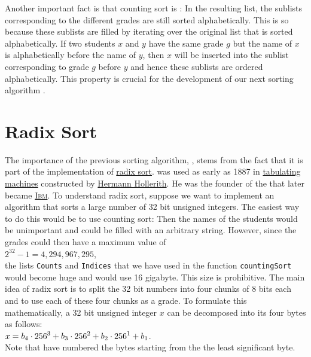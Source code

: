 Another important fact is that counting sort is : In the resulting list, the sublists
corresponding to the different grades are still sorted alphabetically.  This is so because these sublists are
filled by iterating over the original list that is sorted alphabetically.  If two students $x$ and $y$ have the
same grade $g$ but the name of $x$ is alphabetically before the name of $y$, then $x$ will be inserted into the
sublist corresponding to grade $g$ before $y$ and hence these sublists are ordered alphabetically.  This property
is crucial for the development of our next sorting algorithm .

\section{Radix Sort}
The importance of the previous sorting algorithm, , stems from the fact that it is part of the
implementation of \href{https://en.wikipedia.org/wiki/Radix_sort}{radix sort}.   was used as early as 1887 in
\href{https://en.wikipedia.org/wiki/Tabulating_machine}{tabulating machines} constructed by
\href{https://en.wikipedia.org/wiki/Herman_Hollerith}{Hermann Hollerith}.  He was the founder of
the  that later became \href{https://en.wikipedia.org/wiki/IBM}{\textsc{Ibm}}.
To understand radix sort, suppose we want to implement an algorithm that sorts a large number of 32 bit
unsigned integers.  The easiest way to do this would be to use counting sort:  Then the names of the
students would be unimportant and could be filled with an arbitrary string.  However, since the grades could then
have a maximum value of 
\\[0.2cm]
\hspace*{1.3cm}
$2^{32} - 1 = 4,294,967,295$,
\\[0.2cm]
the lists \texttt{Counts} and \texttt{Indices} that we have used in the function \texttt{countingSort} would
become huge and would use 16 gigabyte.   This size is prohibitive.  The main idea of radix sort is to split the
32 bit numbers into four chunks of 8 bits each and to use each of these four chunks as a grade.  To formulate this
mathematically, a 32 bit unsigned integer $x$ can be decomposed into its four bytes as follows:
\\[0.2cm]
\hspace*{1.3cm}
$\displaystyle x = b_4 \cdot 256^{3} + b_3 \cdot 256^{2} + b_2 \cdot 256^{1} + b_1$.
\\[0.2cm]
Note that have  numbered the bytes starting from the the least significant byte.
